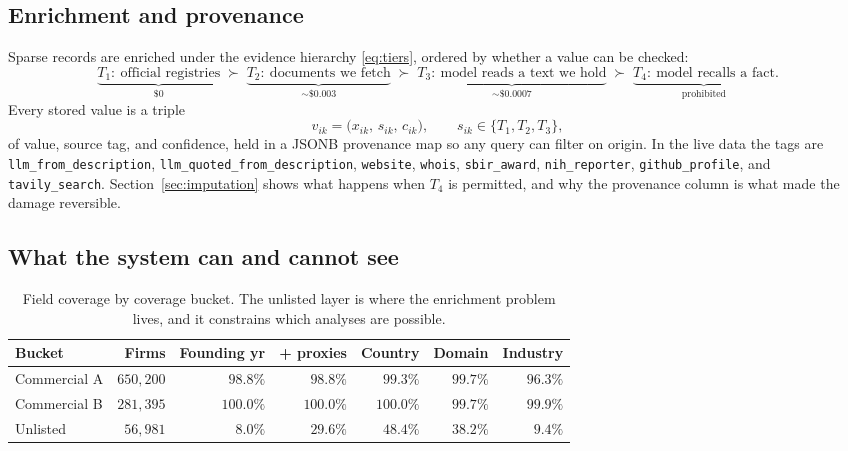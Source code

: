 \documentclass[11pt]{article}
\begin{document}
\subsection{Enrichment and provenance}

Sparse records are enriched under the evidence hierarchy \eqref{eq:tiers},
ordered by whether a value can be checked:
\begin{equation}
\label{eq:tiers}
\underbrace{T_1:\ \text{official registries}}_{\$0}
\;\succ\;
\underbrace{T_2:\ \text{documents we fetch}}_{\sim\$0.003}
\;\succ\;
\underbrace{T_3:\ \text{model reads a text we hold}}_{\sim\$0.0007}
\;\succ\;
\underbrace{T_4:\ \text{model recalls a fact}}_{\text{prohibited}}.
\end{equation}
Every stored value is a triple
\begin{equation}
v_{ik} = \big(x_{ik},\, s_{ik},\, c_{ik}\big), \qquad s_{ik} \in \{T_1,T_2,T_3\},
\end{equation}
of value, source tag, and confidence, held in a JSONB provenance map so any
query can filter on origin. In the live data the tags are
\texttt{llm\_from\_description}, \texttt{llm\_quoted\_from\_description},
\texttt{website}, \texttt{whois}, \texttt{sbir\_award},
\texttt{nih\_reporter}, \texttt{github\_profile}, and \texttt{tavily\_search}.
Section~\ref{sec:imputation} shows what happens when $T_4$ is permitted, and
why the provenance column is what made the damage reversible.

\subsection{What the system can and cannot see}

\begin{table}[htbp]
\centering\small
\caption{Field coverage by coverage bucket. The unlisted layer is where the
enrichment problem lives, and it constrains which analyses are possible.}
\label{tab:coverage}
\begin{tabular}{@{}lrrrrrr@{}}
\toprule
Bucket & Firms & Founding yr & + proxies & Country & Domain & Industry \\
\midrule
Commercial A & $650{,}200$ & $98.8\%$ & $98.8\%$ & $99.3\%$ & $99.7\%$ & $96.3\%$ \\
Commercial B & $281{,}395$ & $100.0\%$ & $100.0\%$ & $100.0\%$ & $99.7\%$ & $99.9\%$ \\
Unlisted     & $56{,}981$  & $8.0\%$   & $29.6\%$  & $48.4\%$ & $38.2\%$ & $9.4\%$ \\
\bottomrule
\end{tabular}
\end{table}
\end{document}

